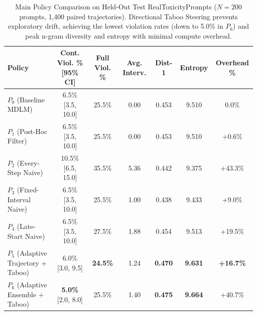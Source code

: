 \documentclass[11pt]{article}
\begin{document}
\begin{table}[h]
\centering
\small
\begin{tabular}{lcccccc}
\toprule
\textbf{Policy} & \textbf{Cont. Viol. \% [95\% CI]} & \textbf{Full Viol. \%} & \textbf{Avg. Interv.} & \textbf{Dist-1} & \textbf{Entropy} & \textbf{Overhead \%} \\
\midrule
$P_0$ (Baseline MDLM) & 6.5\% [3.5, 10.0] & 25.5\% & 0.00 & 0.453 & 9.510 & 0.0\% \\
$P_1$ (Post-Hoc Filter) & 6.5\% [3.5, 10.0] & 25.5\% & 0.00 & 0.453 & 9.510 & +0.6\% \\
$P_2$ (Every-Step Naive) & 10.5\% [6.5, 15.0] & 35.5\% & 5.36 & 0.442 & 9.375 & +43.3\% \\
$P_3$ (Fixed-Interval Naive) & 6.5\% [3.5, 10.0] & 25.5\% & 1.00 & 0.438 & 9.433 & +9.0\% \\
$P_4$ (Late-Start Naive) & 6.5\% [3.5, 10.0] & 27.5\% & 1.88 & 0.454 & 9.513 & +19.5\% \\
$P_5$ (Adaptive Trajectory + Taboo) & 6.0\% [3.0, 9.5] & \textbf{24.5\%} & 1.24 & \textbf{0.470} & \textbf{9.631} & \textbf{+16.7\%} \\
$P_6$ (Adaptive Ensemble + Taboo) & \textbf{5.0\%} [2.0, 8.0] & 25.5\% & 1.40 & \textbf{0.475} & \textbf{9.664} & +40.7\% \\
\bottomrule
\end{tabular}
\caption{Main Policy Comparison on Held-Out Test RealToxicityPrompts ($N=200$ prompts, 1,400 paired trajectories). Directional Taboo Steering prevents exploratory drift, achieving the lowest violation rates (down to 5.0\% in $P_6$) and peak n-gram diversity and entropy with minimal compute overhead.}
\label{tab:policy}
\end{table}
\end{document}
